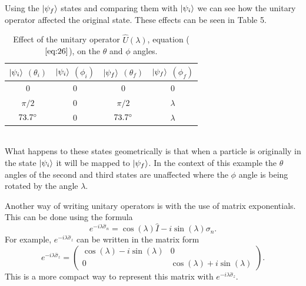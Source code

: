 \documentclass[twocolumn]{article}
\begin{document}
Using the $\ket{\psi_f}$ states and comparing them with $\ket{\psi_i}$ we can see how the unitary operator affected the original state. These effects can be seen in Table 5.
\begin{table}[h!]
\begin{center}
\begin{tabular}{ |c|c|c|c| }
\hline $\ket{\psi_i}$ $(\theta_i)$& $\ket{\psi_i}$ $(\phi_i)$& $\ket{\psi_f}$ $(\theta_f)$& $\ket{\psi_f}$ $(\phi_f)$ \\
\hline 0 & 0 & 0 & 0 \\
\hline $\pi/2$ & 0 & $\pi/2$ & $\lambda$ \\
\hline $73.7\degree$ & $0$ & $73.7\degree$ & $\lambda$ \\
\hline
\end{tabular}
\caption{Effect of the unitary operator $\hat{U}(\lambda)$, equation ($\ref{eq:26}$), on the $\theta$ and $\phi$ angles.}
\end{center}
\end{table} \\
What happens to these states geometrically is that when a particle is originally in the state $\ket{\psi_i}$ it will be mapped to $\ket{\psi_f}$. In the context of this example the $\theta$ angles of the second and third states are unaffected where the $\phi$ angle is being rotated by the angle $\lambda$. 

Another way of writing unitary operators is with the use of matrix exponentials. This can be done using the formula
\begin{equation}\label{eq:27}
e^{-i\lambda\hat{\sigma}_n}=\cos{(\lambda)}\hat{I}-i\sin{(\lambda)}\hat{\sigma_n}.
\end{equation}
For example, $e^{-i\lambda\hat{\sigma}_z}$ can be written in the matrix form
\begin{equation}\label{eq:28}
e^{-i\lambda\hat{\sigma}_z}=
\begin{pmatrix}
\cos{(\lambda)}-i\sin{(\lambda)} & 0 \\
0 & \cos{(\lambda)}+i\sin{(\lambda)}
\end{pmatrix}.
\end{equation}
This is a more compact way to represent this matrix with $e^{-i\lambda\hat{\sigma}_z}$.
\end{document}

